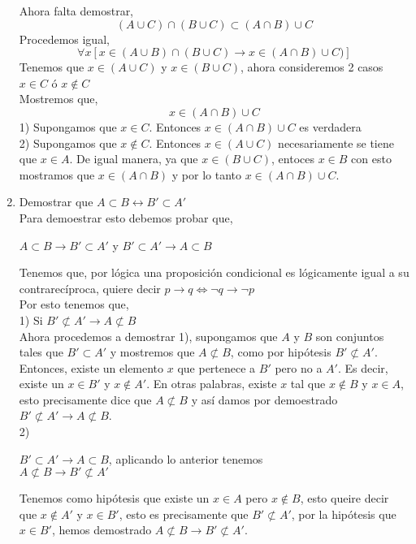 \documentclass[12pt]{exam}
\begin{document}
\begin{enumerate}
		Ahora falta demostrar,
		$$ (A \cup C) \cap (B \cup C) \subset (A \cap B) \cup C$$
		Procedemos igual,
		$$\forall x [x \in (A \cup B) \cap (B \cup C) \rightarrow x \in (A \cap B) \cup C)] $$
		Tenemos que $x \in (A \cup C)$ y $x \in (B \cup C)$, ahora consideremos 2 casos $x \in C$ ó $x \notin C$\\\vspace{2mm}
		Mostremos que,
		$$x \in (A \cap B) \cup C$$
		1) Supongamos que $x \in C$. Entonces $x \in (A \cap B)\cup C$ es verdadera\\\vspace{2mm}
		2) Supongamos que $x \notin C$. Entonces $x \in (A \cup C)$ necesariamente se tiene que $x \in A$. De igual manera, ya que $x \in (B \cup C)$, entoces $x \in B$ con esto mostramos que $x \in (A \cap B)$ y por lo tanto $x \in (A \cap B) \cup C$.
		\vspace{4mm}
		\item Demostrar que $A \subset B \leftrightarrow B' \subset A'$ \\\vspace{2mm}
		Para demoestrar esto debemos probar que,\\
		\begin{center}
			$A \subset B \rightarrow B' \subset A'$ y $B' \subset A' \rightarrow A \subset B$
		\end{center}
		Tenemos que, por lógica una proposición condicional es lógicamente igual a su contrarecíproca, quiere decir $p \rightarrow q \Leftrightarrow \neg q \rightarrow \neg p$ \\\vspace{2mm}
		Por esto tenemos que,\\\vspace{2mm}
		1) Si $B' \not\subset A' \rightarrow A \not\subset B$\\\vspace{2mm}
		Ahora procedemos a demostrar 1), supongamos que $A$ y $B$ son conjuntos tales que $B' \subset A'$ y mostremos que $A \not\subset B$, como por hipótesis $B' \not\subset A'$. Entonces, existe un elemento $x$ que pertenece a $B'$ pero no a $A'$. Es decir, existe un $x \in B'$ y $x \notin A'$. En otras palabras, existe $x$ tal que $x \notin B$ y $x \in A$, esto precisamente dice que $A \not\subset B$ y así damos por demoestrado $B' \not\subset A' \rightarrow A \not\subset B$.\\\vspace{2mm}
		2) \begin{center} 
			$B' \subset A' \rightarrow  A \subset B$, aplicando lo anterior tenemos\\\vspace{2mm}
			$A \not\subset B \rightarrow  B' \not\subset A'$
			\end{center} 
			Tenemos como hipótesis que existe un $x \in A$ pero $x \notin B$, esto queire decir que $x \notin A'$ y $x \in B'$, esto es precisamente que $B' \not\subset A'$, por la hipótesis que $x \in B'$, hemos demostrado $A \not\subset B \rightarrow  B' \not\subset A'$.
\end{enumerate}
\end{document}
